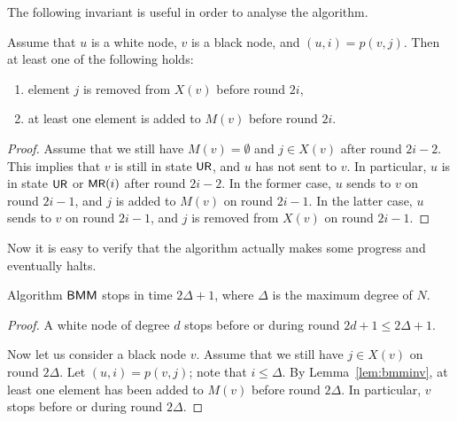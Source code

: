 The following invariant is useful in order to analyse the algorithm.
\begin{lemma}\label{lem:bmminv}
    Assume that $u$ is a white node, $v$ is a black node, and $(u,i) = p(v,j)$. Then at least one of the following holds:
    \begin{enumerate}[noitemsep]
        \item element $j$ is removed from $X(v)$ before round $2i$,
        \item at least one element is added to $M(v)$ before round $2i$.
    \end{enumerate}
\end{lemma}
\begin{proof}
    Assume that we still have $M(v) = \emptyset$ and $j \in X(v)$ after round $2i-2$. This implies that $v$ is still in state $\textsf{\small UR}$, and $u$ has not sent  to $v$. In particular, $u$ is in state $\textsf{\small UR}$ or $\textsf{\small MR}(i)$ after round $2i-2$. In the former case, $u$ sends  to $v$ on round $2i-1$, and $j$ is added to $M(v)$ on round $2i-1$. In the latter case, $u$ sends  to $v$ on round $2i-1$, and $j$ is removed from $X(v)$ on round $2i-1$.
\end{proof}

Now it is easy to verify that the algorithm actually makes some progress and eventually halts.
\begin{lemma}\label{lem:bmm-time}
    Algorithm $\textsf{BMM}$ stops in time $2\Delta+1$, where $\Delta$ is the maximum degree of $N$.
\end{lemma}
\begin{proof}
    A white node of degree $d$ stops before or during round $2d+1 \le 2\Delta+1$.
    
    Now let us consider a black node $v$. Assume that we still have $j \in X(v)$ on round $2\Delta$. Let $(u,i) = p(v,j)$; note that $i \le \Delta$. By Lemma~\ref{lem:bmminv}, at least one element has been added to $M(v)$ before round $2\Delta$. In particular, $v$ stops before or during round $2\Delta$.
\end{proof}

